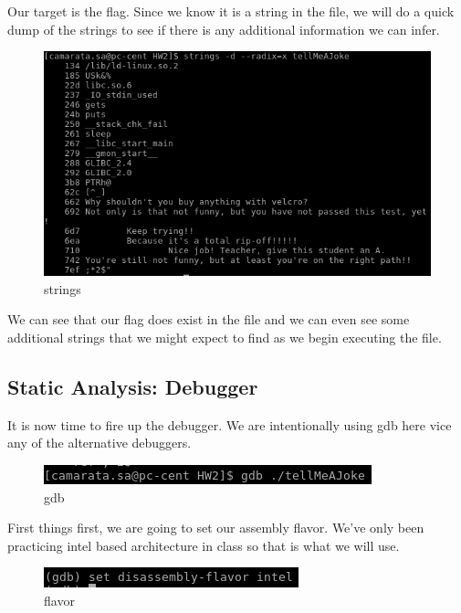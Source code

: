\documentclass[10pt]{article}
\begin{document}
Our target is the flag.  Since we know it is a string in the file, we will do a quick dump of the strings to see if there is any additional information we can infer.

\begin{figure}[H]
\centering
\includegraphics[scale=0.5]{./images/ss3.png}
\caption{strings}
\label{fig:Code}
\end{figure}

We can see that our flag does exist in the file and we can even see some additional strings that we might expect to find as we begin executing the file.

\subsection{Static Analysis: Debugger}
It is now time to fire up the debugger.  We are intentionally using gdb here vice any of the alternative debuggers.

\begin{figure}[H]
\centering
\includegraphics[scale=0.5]{./images/ss4.png}
\caption{gdb}
\label{fig:Code}
\end{figure}

First things first, we are going to set our assembly flavor.  We've only been practicing intel based architecture in class so that is what we will use.

\begin{figure}[H]
\centering
\includegraphics[scale=0.5]{./images/ss5.png}
\caption{flavor}
\label{fig:Code}
\end{figure}
\end{document}
